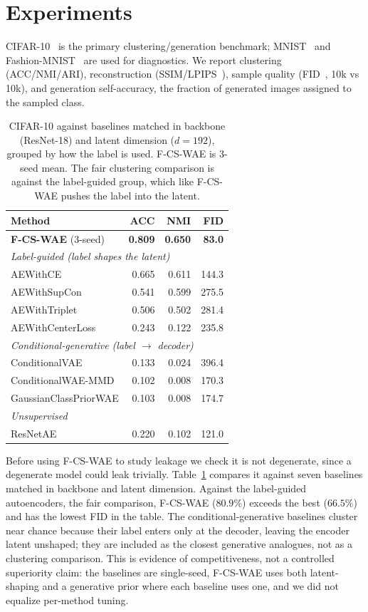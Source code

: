 \documentclass[letterpaper]{article} %
\newcommand{\ours}{F-CS-WAE}
\begin{document}
\section{Experiments}

CIFAR-10~\citep{krizhevsky2009learning} is the primary
clustering/generation benchmark; MNIST~\citep{lecun1998gradient} and
Fashion-MNIST~\citep{xiao2017fashion} are used for diagnostics. We report
clustering (ACC/NMI/ARI), reconstruction (SSIM/LPIPS~\citep{zhang2018unreasonable}),
sample quality (FID~\citep{heusel2017gans}, 10k vs 10k), and generation
self-accuracy, the fraction of generated images assigned to the sampled
class.

\begin{table}[t]
\centering
\small
\setlength{\tabcolsep}{5pt}
\caption{CIFAR-10 against baselines matched in backbone (ResNet-18) and
latent dimension ($d{=}192$), grouped by how the label is used. \ours{} is
3-seed mean. The fair clustering comparison is against the label-guided
group, which like \ours{} pushes the label into the latent.}
\label{tab:cifar-main}
\begin{tabular}{lrrr}
\toprule
Method & ACC & NMI & FID \\
\midrule
\textbf{\ours{}} (3-seed) & \textbf{0.809} & \textbf{0.650} & \textbf{83.0} \\
\midrule
\multicolumn{4}{l}{\emph{Label-guided (label shapes the latent)}} \\
AEWithCE & 0.665 & 0.611 & 144.3 \\
AEWithSupCon & 0.541 & 0.599 & 275.5 \\
AEWithTriplet & 0.506 & 0.502 & 281.4 \\
AEWithCenterLoss & 0.243 & 0.122 & 235.8 \\
\multicolumn{4}{l}{\emph{Conditional-generative (label $\to$ decoder)}} \\
ConditionalVAE & 0.133 & 0.024 & 396.4 \\
ConditionalWAE-MMD & 0.102 & 0.008 & 170.3 \\
GaussianClassPriorWAE & 0.103 & 0.008 & 174.7 \\
\multicolumn{4}{l}{\emph{Unsupervised}} \\
ResNetAE & 0.220 & 0.102 & 121.0 \\
\bottomrule
\end{tabular}
\end{table}

Before using \ours{} to study leakage we check it is not degenerate, since a
degenerate model could leak trivially. Table~\ref{tab:cifar-main} compares it
against seven baselines matched in backbone and latent dimension. Against the
label-guided autoencoders, the fair comparison, \ours{} ($80.9\%$) exceeds the
best ($66.5\%$) and has the lowest FID in the table. The
conditional-generative baselines cluster near chance because their label
enters only at the decoder, leaving the encoder latent unshaped; they are
included as the closest generative analogues, not as a clustering
comparison. This is evidence of competitiveness, not a controlled
superiority claim: the baselines are single-seed, \ours{} uses both
latent-shaping and a generative prior where each baseline uses one, and we
did not equalize per-method tuning.
\end{document}
